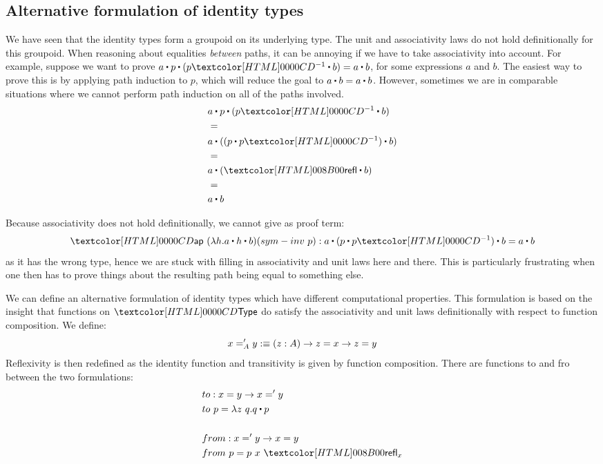 \subsection{Alternative formulation of identity types}
\label{alt-identity-type}
We have seen that the identity types form a groupoid on its underlying
type. The unit and associativity laws do not hold definitionally for
this groupoid. When reasoning about equalities \emph{between} paths,
it can be annoying if we have to take associativity into account. For
example, suppose we want to prove
$a \ct p \ct (\sym{p} \ct b) = a \ct b$, for some expressions $a$ and
$b$. The easiest way to prove this is by applying path induction to
$p$, which will reduce the goal to $a \ct b = a \ct b$. However,
sometimes we are in comparable situations where we cannot perform path
induction on all of the paths involved.
\begin{align*}
  &a \ct p \ct (\sym{p} \ct b) \\
  &= \\
  &a \ct ((p \ct \sym{p}) \ct b) \\
  &= \\
  &a \ct (\refl \ct b) \\
  &= \\
  &a \ct b
\end{align*}

Because associativity does not hold definitionally, we cannot give as
proof term:
$$
\ap\ (\lambda h . a \ct h \ct b) (sym-inv\ p) : a \ct (p \ct \sym{p}) \ct b = a \ct b
$$
as it has the wrong type, hence we are stuck with filling in
associativity and unit laws here and there. This is particularly
frustrating when one then has to prove things about the resulting path
being equal to something else.

We can define an alternative formulation of identity types which have
different computational properties. This formulation is based on the
insight that functions on $\Type$ do satisfy the associativity and
unit laws definitionally with respect to function composition. We define:
$$
x ='_{A} y :\equiv (z : A) \to z = x \to z = y
$$
Reflexivity is then redefined as the identity function and
transitivity is given by function composition. There are functions to
and fro between the two formulations:
\begin{align*}
  &to : x = y \to x \alteq y \\
  &to\ p = \lambda z\ q . \trans{q}{p} \\
  \\
  &from : x \alteq y \to x = y \\
  &from\ p = p\ x\ \refl_{x}
\end{align*}

